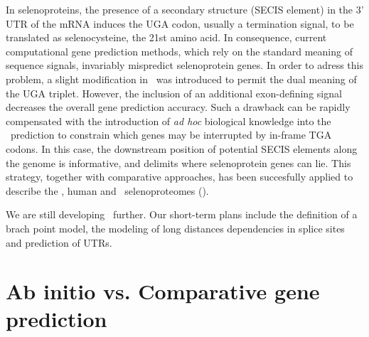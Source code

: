 In selenoproteins, the presence of a secondary structure (SECIS
element) in the 3' UTR of the mRNA induces the UGA codon, usually a
termination signal, to be translated as selenocysteine, the 21st amino
acid. In consequence, current computational gene prediction methods,
which rely on the standard meaning of sequence signals, invariably
mispredict selenoprotein genes. In order to adress this problem, a
slight modification in \geneid\ was introduced to permit the dual
meaning of the UGA triplet. However, the inclusion of an additional
exon-defining signal decreases the overall gene prediction
accuracy. Such a drawback can be rapidly compensated with the
introduction of \textit{ad hoc} biological knowledge into the \geneid\
prediction to constrain which genes may be interrupted by in-frame TGA
codons. In this case, the downstream position of potential SECIS
elements along the genome is informative, and delimits where
selenoprotein genes can lie. This strategy, together with comparative
approaches, has been succesfully applied to describe the \DmL, human
and \TrL\ selenoproteomes (\cite{castellano:2001a,kryukov:2003a,
castellano:2004a}).

We are still developing \geneid\ further. Our short-term plans include
the definition of a brach point model, the modeling of long distances
dependencies in splice sites and prediction of UTRs.










\section{Ab initio vs. Comparative gene prediction}

